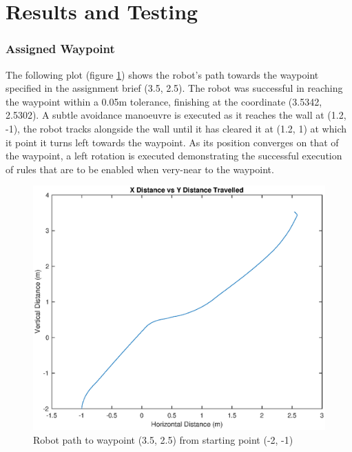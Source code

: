 \documentclass[10pt]{article}
\newcommand{\graphScale}{0.4}
\begin{document}
\section{Results and Testing}
\subsubsection{Assigned Waypoint}
The following plot (figure \ref{fig:ToWaypoint}) shows the robot's path towards the waypoint specified in the assignment brief (3.5, 2.5).
The robot was successful in reaching the waypoint within a 0.05m tolerance, finishing at the coordinate (3.5342, 2.5302).
A subtle avoidance manoeuvre is executed as it reaches the wall at (1.2, -1), the robot tracks alongside the wall until it has cleared it at (1.2, 1) at which it point it turns left towards the waypoint.
As its position converges on that of the waypoint, a left rotation is executed demonstrating the successful execution of rules that are to be enabled when very-near to the waypoint. 
\begin{figure}[H]
    \centering
\includegraphics[scale=\graphScale]{./figures/ToWaypoint.eps}
\caption{Robot path to waypoint (3.5, 2.5) from starting point (-2, -1)}
\label{fig:ToWaypoint}
\end{figure}
\end{document}

